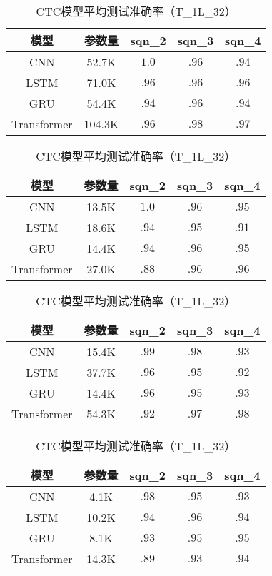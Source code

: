 \begin{table}[htbp]
    \centering
        \caption{CTC模型平均测试准确率（T\_2L\_64）}
    \begin{tabular}{ccccc}
        \hline
        模型 & 参数量 & sqn\_2 & sqn\_3 &sqn\_4\\
        \hline
        CNN & 52.7K & $1.0$ & $.96$& $.94$\\
        LSTM & 71.0K  & $.96$& $.96$ & $.96$\\
        GRU & 54.4K  & $.94$ & $.96$ & $.94$\\
        Transformer & 104.3K & $.96$ & $.98$ & $.97$\\
        \hline
    \end{tabular}

    \label{tab:ch6-2l64}

    \centering
        \caption{CTC模型平均测试准确率（T\_2L\_32）}
    \begin{tabular}{ccccc}
        \hline
        模型 & 参数量 & sqn\_2 & sqn\_3 &sqn\_4\\
        \hline
        CNN & 13.5K & $1.0$ & $.96$& $.95$\\
        LSTM & 18.6K  & $.94$& $.95$ & $.91$\\
        GRU & 14.4K  & $.94$ & $.96$ & $.95$\\
        Transformer & 27.0K & $.88$ & $.96$ & $.96$\\
        \hline
    \end{tabular}

    \label{tab:ch6-2l32}

    \centering
        \caption{CTC模型平均测试准确率（T\_1L\_64）}
    \begin{tabular}{ccccc}
        \hline
        模型 & 参数量 & sqn\_2 & sqn\_3 &sqn\_4\\
        \hline
        CNN & 15.4K & $.99$ & $.98$& $.93$\\
        LSTM & 37.7K  & $.96$& $.95$ & $.92$\\
        GRU & 14.4K  & $.96$ & $.95$ & $.93$\\
        Transformer & 54.3K & $.92$ & $.97$ & $.98$\\
        \hline
    \end{tabular}
    \label{tab:ch6-1l64}

    \centering
        \caption{CTC模型平均测试准确率（T\_1L\_32）}
    \begin{tabular}{ccccc}
        \hline
        模型 & 参数量 & sqn\_2 & sqn\_3 &sqn\_4\\
        \hline
        CNN & 4.1K & $.98$ & $.95$& $.93$\\
        LSTM & 10.2K  & $.94$& $.96$ & $.94$\\
        GRU & 8.1K  & $.93$ & $.95$ & $.95$\\
        Transformer & 14.3K & $.89$ & $.93$ & $.94$\\
        \hline
    \end{tabular}
    \label{tab:ch6-1l32}
\end{table}

